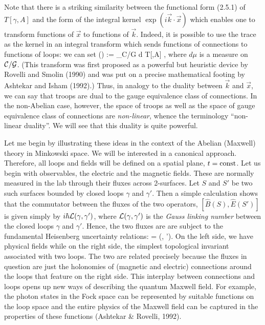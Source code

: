 Note that there is a striking similarity between the functional form
(2.5.1) of $T[\gamma, A]$ and the form of the integral kernel $\exp
(i\vec{k}\cdot \vec{x})$ which enables one to transform functions of
$\vec{x}$ to functions of $\vec{k}$. Indeed, it is possible to use the
trace as the kernel in an integral transform which sends
functions of connections to functions of loops: we can set
\bneq
\psi(\gamma) := \lint_{{\cal C}/{\cal G}}\- d\mu\- T[\gamma ,A] \Psi[A] ,
where $d\mu$ is a measure on ${\cal C}/{\cal G}$. (This transform was first
proposed as a powerful but heuristic device by Rovelli and Smolin (1990)
and was put on a precise mathematical footing by Ashtekar and Isham (1992).)
Thus, in analogy to the duality between $\vec k$ and $\vec x$,
we can say that troops are dual to the gauge equivalence class of connections.
In the non-Abelian case, however, the space of troops as well as the space
of gauge equivalence class of connections are {\it non-linear}, whence the
terminology ``non-linear duality''. We will see that this duality is quite
powerful.

Let me begin by illustrating these ideas in the context of the Abelian
(Maxwell) theory in Minkowski space. We will be interested in a canonical
approach. Therefore, all loops and fields will be defined on a spatial
plane, $t={\rm const}$. Let us begin with observables, the electric and
the magnetic fields. These are normally measured in the lab through their
fluxes across 2-surfaces. Let $S$ and $S'$ be two such surfaces bounded by
closed loops $\gamma$ and $\gamma'$. Then a simple calculation shows that
the commutator between the fluxes of the two operators, $[\hat{B}(S),
\hat{E}(S')]$ is given simply by $i\hbar {\cal L}(\gamma, \gamma')$, where
${\cal L}(\gamma, \gamma')$ is the {\it Gauss linking number} between
the closed loops $\gamma$ and $\gamma'$. Hence, the two fluxes are
are subject to the fundamental Heisenberg uncertainty relations:
\bneq
\Delta[\hat{E}(S)]\cdot \Delta[\hat{B}(S')] = (\gamma ,
\gamma').
On the left side, we have physical fields while on the right side,
the simplest topological invariant associated with two loops. The two
are related precisely because the fluxes in question are just the
holonomies of (magnetic and electric) connections around the loops
that feature on the right side. This interplay between connections and
loops opens up new ways of describing the quantum Maxwell field. For
example, the photon states in the Fock space can be represented by suitable
functions on the loop space and the entire physics of the Maxwell field can
be captured in the properties of these functions (Ashtekar \& Rovelli,
1992).

